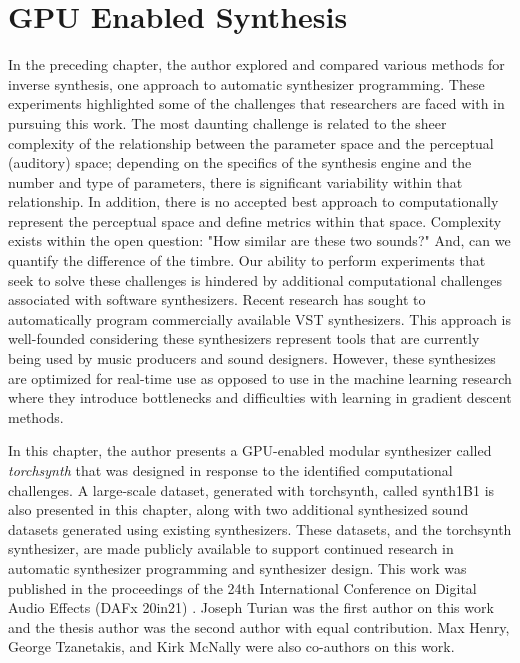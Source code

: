 \graphicspath{{./}{./figures/}{./figures/torchsynth/}}

\chapter{GPU Enabled Synthesis}
\label{chapter:torchsynth}

In the preceding chapter, the author explored and compared various methods for inverse synthesis, one approach to automatic synthesizer programming. These experiments highlighted some of the challenges that researchers are faced with in pursuing this work. The most daunting challenge is related to the sheer complexity of the relationship between the parameter space and the perceptual (auditory) space; depending on the specifics of the synthesis engine and the number and type of parameters, there is significant variability within that relationship. In addition, there is no accepted best approach to computationally represent the perceptual space and define metrics within that space. Complexity exists within the open question:  "How similar are these two sounds?" And, can we quantify the difference of the timbre. Our ability to perform experiments that seek to solve these challenges is hindered by additional computational challenges associated with software synthesizers. Recent research has sought to automatically program commercially available VST synthesizers. This approach is well-founded considering these synthesizers represent tools that are currently being used by music producers and sound designers. However, these synthesizes are optimized for real-time use as opposed to use in the machine learning research where they introduce bottlenecks \cite{masudo2021quality} and difficulties with learning in gradient descent methods.

In this chapter, the author presents a GPU-enabled modular synthesizer called \textit{torchsynth} that was designed in response to the identified computational challenges. A large-scale dataset, generated with torchsynth, called synth1B1 is also presented in this chapter, along with two additional synthesized sound datasets generated using existing synthesizers. These datasets, and the torchsynth synthesizer, are made publicly available to support continued research in automatic synthesizer programming and synthesizer design. This work was published in the proceedings of the 24th International Conference on Digital Audio Effects (DAFx 20in21) \cite{turian2021one}. Joseph Turian was the first author on this work and the thesis author was the second author with equal contribution. Max Henry, George Tzanetakis, and Kirk McNally were also co-authors on this work.

